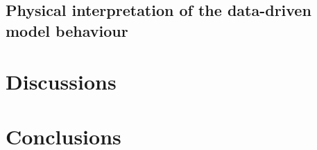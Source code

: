 



















\subsection{Physical interpretation of the data-driven model behaviour}
\label{data_driven_flash_floods_short_medium_range_physical_interpretation}


\section{Discussions}
\label{data_driven_flash_floods_short_medium_range_discussions}


\section{Conclusions}
\label{data_driven_flash_floods_short_medium_range_conclusions}
